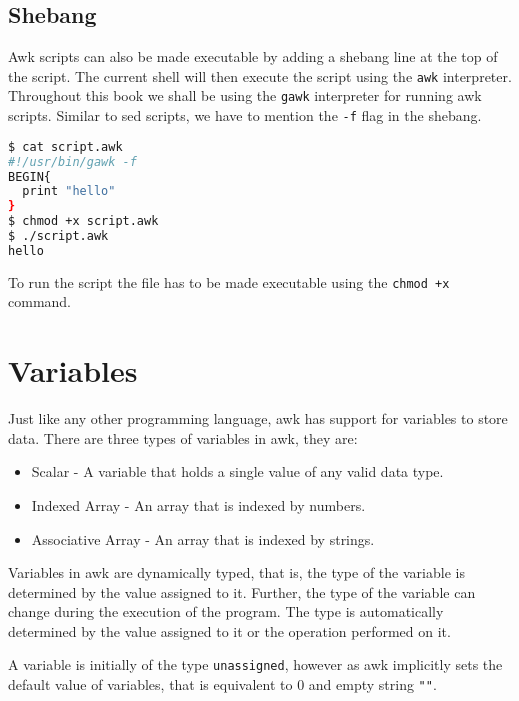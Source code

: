\subsection{Shebang}

Awk scripts can also be made executable by adding a shebang line at the top of the script.
The current shell will then execute the script using the \lstinline|awk| interpreter.
Throughout this book we shall be using the \lstinline|gawk| interpreter for running awk scripts.
Similar to sed scripts, we have to mention the \lstinline|-f| flag in the shebang.

\begin{lstlisting}[language=bash]
$ cat script.awk
#!/usr/bin/gawk -f
BEGIN{
  print "hello"
}
$ chmod +x script.awk
$ ./script.awk
hello
\end{lstlisting}

To run the script the file has to be made executable using the \lstinline|chmod +x| command.

\section{Variables}

Just like any other programming language,
awk has support for variables to store data.
There are three types of variables in awk,
they are:

\begin{itemize}
  \item Scalar - A variable that holds a single value of any valid data type.
  \item Indexed Array - An array that is indexed by numbers.
  \item Associative Array - An array that is indexed by strings.
\end{itemize}

Variables in awk are dynamically typed, that is, the type of the variable is determined by the value assigned to it.
Further, the type of the variable can change during the execution of the program.
The type is automatically determined by the value assigned to it
or the operation performed on it.

A variable is initially of the type \lstinline|unassigned|, however as awk implicitly sets the default value of variables, that is equivalent to $0$ and empty string \lstinline|""|.

